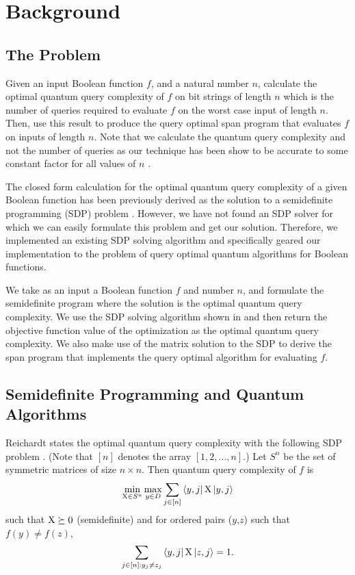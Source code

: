 \section{Background}

\subsection{The Problem}
Given an input Boolean function $f$, and a natural number $n$, 
calculate the optimal quantum query complexity of $f$ on bit 
strings of length $n$ which is the number of queries required to 
evaluate $f$ on the worst case input of length $n$. Then, use 
this result to produce the query
optimal span program that evaluates $f$ on inputs of length $n$. 
Note that we calculate the quantum query complexity and not the 
number of queries as our technique has been show to be accurate 
to some constant factor for all values of $n$ 
\cite{reichardt2009span}.

The closed form calculation for the optimal quantum query 
complexity of a given Boolean function has been previously 
derived as the solution to a semidefinite programming (SDP) 
problem \cite{childs} \cite{reichardt2009span}. However, we have 
not found an SDP solver for which we can easily formulate this 
problem and get our solution. Therefore, we implemented an 
existing SDP solving algorithm \cite{adm} and specifically geared
our implementation to the problem of query optimal quantum 
algorithms for Boolean functions.

We take as an input a Boolean function $f$ and number $n$, and 
formulate the semidefinite program where the solution is the 
optimal quantum query complexity. We use the SDP solving 
algorithm shown in \cite{adm} and then return the objective 
function value of the optimization as the optimal quantum query 
complexity. We also make use of the matrix solution to the SDP to
derive the span program that implements the query optimal 
algorithm for evaluating $f$.

\subsection{Semidefinite Programming and Quantum Algorithms}


Reichardt states the optimal quantum query complexity with the following SDP problem \cite{reichardt2009span}. (Note that $[n]$ denotes the array
$[1,2,...,n]$.)
Let $S^n$ be the set of symmetric matrices of size $n \times n$.
Then quantum query complexity of $f$ is
\begin{align} \label{Eq:reichardt_obj} 
    \min_{\operatorname{X} \in S^n} \max_{y \in D} \sum_{j \in [n]} \bra{y,j}\operatorname{X}\ket{y,j} 
\end{align}
such that $\operatorname{X} \succeq 0$ (semidefinite)
and for ordered pairs ($y$,$z$) such that $f(y) \neq f(z)$,
\begin{align}\label{Eq:reichardt_F0}
    \sum_{j \in [n]: y_j \ne z_j} 
    \bra{y,j} \operatorname{X} \ket{z, j} = 1.
\end{align}

